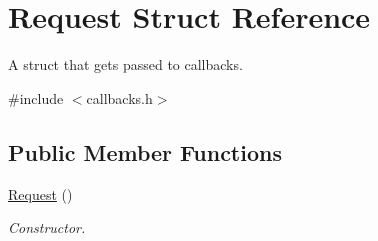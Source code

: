 \hypertarget{structRequest}{\section{Request Struct Reference}
\label{structRequest}
}


A struct that gets passed to callbacks.  




{\ttfamily \#include $<$callbacks.\-h$>$}

\subsection*{Public Member Functions}
\begin{DoxyCompactItemize}
\item 
\hypertarget{structRequest_afaf8d8928de7ffff8a3767589489bd33}{\hyperlink{structRequest_afaf8d8928de7ffff8a3767589489bd33}{Request} ()}\label{structRequest_afaf8d8928de7ffff8a3767589489bd33}

\begin{DoxyCompactList}\small\item\em Constructor. \end{DoxyCompactList}\end{DoxyCompactItemize}
